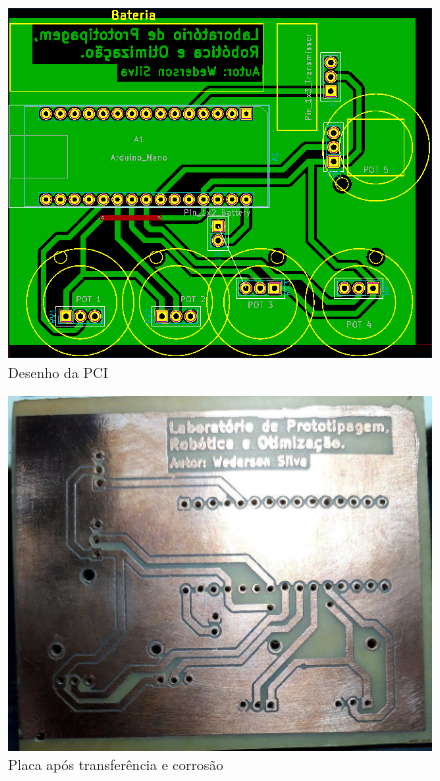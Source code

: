 \documentclass[
	12pt,				%
	openright,			%
	oneside,			%
	a4paper,			%
	english,			%
	brazil				%
	]{abntex2}
\begin{document}
		\begin{figure}[h!]
			\centering
  		\includegraphics[scale=0.5]{./figures/PCB-glove-module1.png}
			\caption{Desenho da PCI}
  		\label{Fig:PCB-glove-module1}
		\end{figure}

		\begin{figure}[h!]
			\centering
  		\includegraphics[scale=0.3]{./figures/phenolic-glove-module1.jpg}
			\caption{Placa após transferência e corrosão}
  		\label{Fig:phenolic-glove-module1}
		\end{figure}
		
\end{document}
